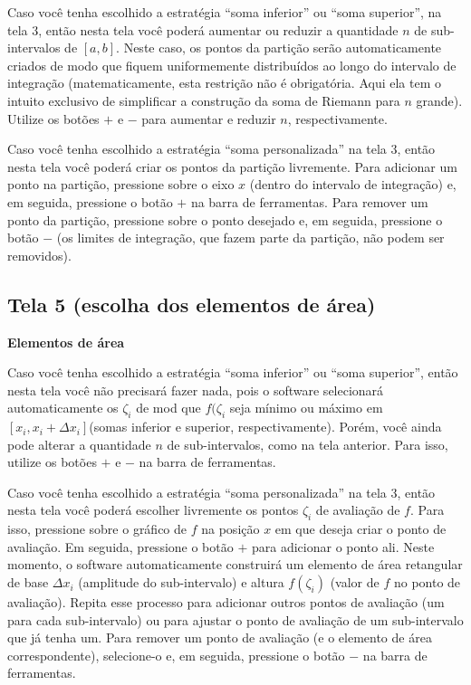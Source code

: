 \documentclass[a4paper,10pt]{scrartcl}
\newcommand\subintervalo{\ensuremath{[x_i, x_i + \Delta x_i]}}
\begin{document}
    Caso você tenha escolhido a estratégia ``soma inferior'' ou ``soma superior'', na tela 3, então nesta tela você poderá aumentar ou reduzir a quantidade $n$ de sub-intervalos de $[a,b]$. Neste caso, os pontos da partição serão automaticamente criados de modo que fiquem uniformemente distribuídos ao longo do intervalo de integração (matematicamente, esta restrição não é obrigatória. Aqui ela tem o intuito exclusivo de simplificar a construção da soma de Riemann para $n$ grande). Utilize os botões $+$ e $-$ para aumentar e reduzir $n$, respectivamente.

    Caso você tenha escolhido a estratégia ``soma personalizada'' na tela 3, então nesta tela você poderá criar os pontos da partição livremente. Para adicionar um ponto na partição, pressione sobre o eixo $x$ (dentro do intervalo de integração) e, em seguida, pressione o botão $+$ na barra de ferramentas. Para remover um ponto da partição, pressione sobre o ponto desejado e, em seguida, pressione o botão $-$ (os limites de integração, que fazem parte da partição, não podem ser removidos).
    
  \subsection*{Tela 5 (escolha dos elementos de área)}
    \textbf{Elementos de área}
    
    Caso você tenha escolhido a estratégia ``soma inferior'' ou ``soma superior'', então nesta tela você não precisará fazer nada, pois o software selecionará automaticamente os $\zeta_i$ de mod que $f(\zeta_i$ seja mínimo ou máximo em \subintervalo (somas inferior e superior, respectivamente). Porém, você ainda pode alterar a quantidade $n$ de sub-intervalos, como na tela anterior. Para isso, utilize os botões $+$ e $-$ na barra de ferramentas.
    
    Caso você tenha escolhido a estratégia ``soma personalizada'' na tela 3, então nesta tela você poderá escolher livremente os pontos $\zeta_i$ de avaliação de $f$. Para isso, pressione sobre o gráfico de $f$ na posição $x$ em que deseja criar o ponto de avaliação. Em seguida, pressione o botão $+$ para adicionar o ponto ali. Neste momento, o software automaticamente construirá um elemento de área retangular de base $\Delta x_i$ (amplitude do sub-intervalo) e altura $f(\zeta_i)$ (valor de $f$ no ponto de avaliação). Repita esse processo para adicionar outros pontos de avaliação (um para cada sub-intervalo) ou para ajustar o ponto de avaliação de um sub-intervalo que já tenha um. Para remover um ponto de avaliação (e o elemento de área correspondente), selecione-o e, em seguida, pressione o botão $-$ na barra de ferramentas.
    
\end{document}
